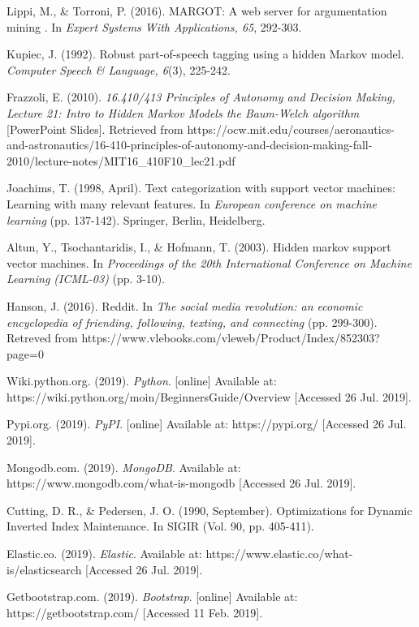 \documentclass[12pt,a4paper]{article}
\begin{document}
\begin{thebibliography}{9}
  Lippi, M., \& Torroni, P. (2016). MARGOT: A web server for argumentation mining . In \textit{Expert Systems With Applications, 65}, 292-303.
  
  Kupiec, J. (1992). Robust part-of-speech tagging using a hidden Markov model. \textit{Computer Speech \& Language, 6}(3), 225-242.
  
  Frazzoli, E. (2010). \textit{16.410/413 Principles of Autonomy and Decision Making, Lecture 21:  Intro to Hidden Markov Models the Baum-Welch algorithm} [PowerPoint Slides]. Retrieved from https://ocw.mit.edu/courses/aeronautics-and-astronautics/16-410-principles-of-autonomy-and-decision-making-fall-2010/lecture-notes/MIT16\_410F10\_lec21.pdf

  Joachims, T. (1998, April). Text categorization with support vector machines: Learning with many relevant features. In \textit{European conference on machine learning} (pp. 137-142). Springer, Berlin, Heidelberg.
  
  Altun, Y., Tsochantaridis, I., \& Hofmann, T. (2003). Hidden markov support vector machines. In \textit{Proceedings of the 20th International Conference on Machine Learning (ICML-03)} (pp. 3-10).
  
  Hanson, J. (2016). Reddit. In \textit{The social media revolution: an economic encyclopedia of friending, following, texting, and connecting} (pp. 299-300). Retreved from https://www.vlebooks.com/vleweb/Product/Index/852303?page=0
  
  Wiki.python.org. (2019). \textit{Python}. [online] Available at: https://wiki.python.org/moin/BeginnersGuide/Overview [Accessed 26 Jul. 2019].
  
  Pypi.org. (2019). \textit{PyPI}. [online] Available at: https://pypi.org/ [Accessed 26 Jul. 2019].
  
  Mongodb.com. (2019). \textit{MongoDB}. Available at: https://www.mongodb.com/what-is-mongodb [Accessed 26 Jul. 2019].
  
  Cutting, D. R., \& Pedersen, J. O. (1990, September). Optimizations for Dynamic Inverted Index Maintenance. In SIGIR (Vol. 90, pp. 405-411).
  
  Elastic.co. (2019). \textit{Elastic}. Available at: https://www.elastic.co/what-is/elasticsearch [Accessed 26 Jul. 2019].
 
  Getbootstrap.com. (2019). \textit{Bootstrap}. [online] Available at: https://getbootstrap.com/ [Accessed 11 Feb. 2019].


\end{thebibliography}
\end{document}
